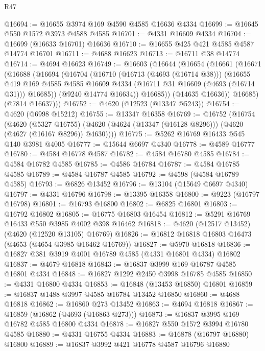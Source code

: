 \begin{lexlean}{R47}
\begin{coremodule}
@16694 := @16655 @3974 @169 @4590 @4585 @16636 @4334
@16699 := @16645 @550 @1572 @3973 @4588 @4585
@16701 := @4331 @16609 @4334
@16704 := @16699 (@16633 @16701) @16636
@16710 := @16655 @425 @421 @4585 @4587 @14774 @16701
@16711 := @4688 @16623
@16713 := @16711 @38 @14774
@16714 := @4694 @16623
@16749 := @16603
    (@16644
      (@16654
        (@16661
          (@16671
            (@16688
              (@16694
                (@16704
                  (@16710
                    (@16713 (@4693 (@16714 @38)))
                    (@16655
                      @419
                      @169
                      @4585
                      @4585
                      @16609
                      @4334
                      (@16711 @31 @16609 (@4693 (@16714 @31)))
                      @16685))
                  (@9240 @14774 @16634))
                @16685))
            (@14635 @16636))
          @16685)
        (@7814 @16637)))
@16752 := @4620 (@12523 (@13347 @5243))
@16754 := @4620 (@6998 @15212)
@16755 := @13347 @16358
@16769 := @16752
    (@16754
      (@4620
        (@5327 @16755)
        (@4620 (@4624 (@13347 (@16128 @8296))) (@4620 (@4627 (@16167 @8296)) @4630))))
@16775 := @5262 @16769 @16433 @545 @140 @3981 @4005
@16777 := @15644 @6697 @4340
@16778 := @4589 @16777
@16780 := @4584 @16778 @4587
@16782 := @4584 @16780 @4585
@16784 := @4584 @16782 @4585
@16785 := @4586 @16784
@16787 := @4584 @16785 @4585
@16789 := @4584 @16787 @4585
@16792 := @4598 (@4584 @16789 @4585)
@16793 := @6826 @13452
@16796 := @13104 (@15649 @6697 @4340)
@16797 := @4331 @16796
@16798 := @13395 @16358
@16800 := @9223 (@16797 @16798)
@16801 := @16793 @16800
@16802 := @6825 @16801
@16803 := @16792 @16802
@16805 := @16775 @16803 @16454
@16812 := @5291 @16769 @16433 @550 @3985 @4002 @398 @16462
@16818 := @4620 (@12517 @13452) (@4620 (@12520 @13105) @16769)
@16826 := @16812 @16818 @16803 @16473 (@4653 (@4654 @3985 @16462 @16769))
@16827 := @5970 @16818
@16836 := @16827 @381 @3919 @4001 @16789 @4585 (@4331 @16801 @4334) @16802
@16837 := @4679 @16818
@16843 := @16837 @3999 @169 @16787 @4585 @16801 @4334
@16848 := @16827 @1292 @2450 @3998 @16785 @4585
@16850 := @4331 @16800 @4334
@16853 := @16848 (@13453 @16850) @16801
@16859 := @16837 @1488 @3997 @4585 @16784 @13452 @16850
@16860 := @4688 @16818
@16862 := @16860 @273 @13452
@16863 := @4694 @16818
@16867 := @16859 (@16862 (@4693 (@16863 @273)))
@16873 := @16837 @3995 @169 @16782 @4585 @16800 @4334
@16878 := @16827 @550 @1572 @3994 @16780 @4585
@16880 := @4331 @16755 @4334
@16883 := @16878 (@16797 @16880) @16800
@16889 := @16837 @3992 @421 @16778 @4587 @16796 @16880

\end{coremodule}
\end{lexlean}
